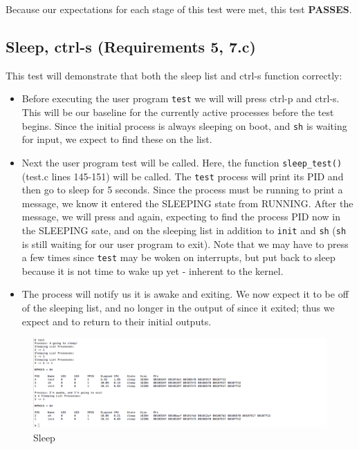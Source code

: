 \documentclass[11pt,letterpaper]{report}
\begin{document}
Because our expectations for each stage of this test were met, this test \textbf{PASSES}.

\subsection*{Sleep, ctrl-s (Requirements 5, 7.c)}

This test will demonstrate that both the sleep list and ctrl-s function correctly:
	\begin{itemize}
		\item Before executing the user program {\tt test} we will will press ctrl-p and ctrl-s. This will be our baseline for the currently active processes before the test begins. Since the initial process is always sleeping on boot, 
			and {\tt sh} is waiting for input, we expect to find these on the list.
		\item Next the user program test will be called. Here, the function {\tt sleep\_test()} (test.c lines 145-151) will be called. The {\tt test} process will print its PID and then go to sleep for 5 seconds. Since the process must be running to print
			a message, we know it entered the SLEEPING state from RUNNING. After the message, we will press  and  again, expecting to find the process PID now in the SLEEPING sate, and
			on the sleeping list in addition to 
			{\tt init} and {\tt sh} ({\tt sh} is still waiting for our user program to exit). Note that we may have to press  a few times since {\tt test} may be woken on interrupts, but put back to sleep because it is not time
			to wake up yet - inherent to the kernel.
		\item The process will notify us it is awake and exiting. We now expect it to be off of the sleeping list, and no longer in the output of  since it exited; thus we expect  and  to return to their initial 
			outputs. 
	\end{itemize}


\begin{figure}[h]
\centering
\includegraphics[width=0.8\linewidth]{sleep.png}
\caption{Sleep}
\label{fig:1}
\end{figure}
\end{document}
